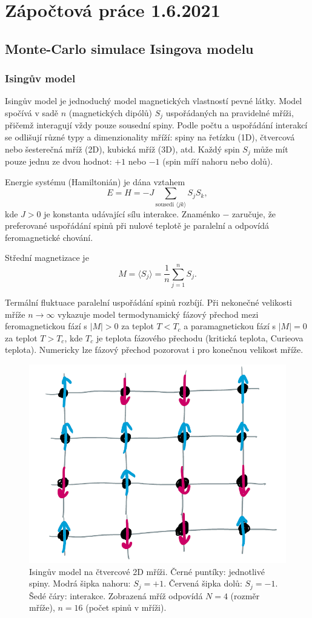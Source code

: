 \documentclass[a4paper,11pt,twoside]{article}
\def\abs#1{\left|#1\right|}
\begin{document}
\section*{Zápočtová práce 1.6.2021}
\subsection*{Monte-Carlo simulace Isingova modelu}
\subsubsection*{Isingův model}
Isingův model je jednoduchý model magnetických vlastností pevné látky. 
Model spočívá v sadě $n$  (magnetických dipólů) $S_{j}$ uspořádaných na pravidelné mříži, přičemž interagují vždy pouze sousední spiny.
Podle počtu a uspořádání interakcí se odlišují různé typy a dimenzionality mříží: spiny na řetízku (1D), čtvercová nebo šesterečná mříž (2D), kubická mříž (3D), atd.
Každý spin $S_{j}$ může mít pouze jednu ze dvou hodnot: $+1$ nebo $-1$ (spin míří nahoru nebo dolů).

Energie systému (Hamiltonián) je dána vztahem
\begin{equation}\label{eq:Hamiltonian}
	E=H=-J\sum_{\text{sousedi }\langle jk\rangle}S_{j}S_{k},
\end{equation}
kde $J>0$ je konstanta udávající sílu interakce.
Znaménko $-$ zaručuje, že preferované uspořádání spinů při nulové teplotě je paralelní a odpovídá feromagnetické chování.

Střední magnetizace je 
\begin{equation}\label{eq:Magnetisation}
	M=\langle S_{j}\rangle=\frac{1}{n}\sum_{j=1}^{n}S_{j}.
\end{equation}

Termální fluktuace paralelní uspořádání spinů rozbíjí.
Při nekonečné velikosti mříže $n\rightarrow\infty$ vykazuje model termodynamický fázový přechod mezi feromagnetickou fází s $\abs{M}>0$ za teplot $T<T_{c}$ a paramagnetickou fází s $\abs{M}=0$ za teplot $T>T_{c}$, kde  $T_{c}$ je teplota fázového přechodu (kritická teplota, Curieova teplota).
Numericky lze fázový přechod pozorovat i pro konečnou velikost mříže.

\begin{figure}[!htbp]
	\centering\includegraphics[width=0.495\linewidth]{Ising.png}
	\caption{
		\protect\small
		Isingův model na čtvercové 2D mříži.
		Černé puntíky: jednotlivé spiny.
		Modrá šipka nahoru: $S_{j}=+1$.
		Červená šipka dolů: $S_{j}=-1$.
		Šedé čáry: interakce.
		Zobrazená mříž odpovídá $N=4$ (rozměr mříže), $n=16$ (počet spinů v mříži).
	}	
	\label{fig:2DIsing}
\end{figure}
\end{document}
